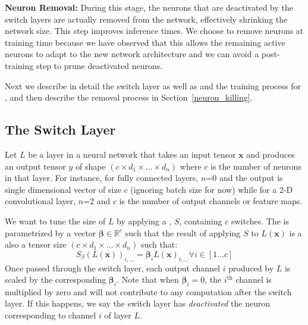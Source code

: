 \noindent\textbf{Neuron Removal: } During this stage, the neurons that are
deactivated by the switch layers are actually removed from the network,
effectively shrinking the network size. This step improves inference times.
We choose to remove neurons at training time
because we have observed that this allows the remaining active neurons to adapt
to the new network architecture and we can avoid a post-training step to prune
deactivated neurons.


Next we describe in detail the switch layer as well as and the training process
for \shrink, and then describe the removal process in
Section~\ref{neuron_killing}.

\subsection{The Switch Layer}

Let $L$ be a layer in a neural network that takes an input tensor $\bm{x}$ and
produces an output tensor $y$ of shape $\left(c \times d_1 \times \dots \times
d_n\right)$ where $c$ is the number of neurons in that layer.  For instance, for
fully connected layers, $n$=0 and the output is single dimensional vector of size $c$
(ignoring batch size for now) while for a 2-D convolutional layer, $n$=2 and $c$
is the number of output channels or feature maps.

We want to tune the size of $L$ by applying a \swl, $S$, containing $c$
switches.  The \swl is parametrized by a vector $\bm{\beta} \in \mathbb{R}^c$ such that the result
of applying $S$ to $L(\bm{x})$ is a also a tensor size $\left(c \times d_1
\times \dots \times d_n\right)$ such that: 
\begin{equation} 
S_{\beta}(L(\bm{x}))_{i,...} = \bm{\beta}_iL(\bm{x})_{i, ...} \forall i \in [1\ldots c]
\end{equation}
Once passed through the switch layer, each output channel $i$
produced by $L$ is scaled by the corresponding $\bm{\beta}_i$. Note that when
$\bm{\beta}_i = 0$, the $i^{\text{th}}$ channel is multiplied by zero and will not
contribute to any computation after the switch layer. If this happens, we say
the switch layer has {\it deactivated} the neuron corresponding to channel $i$ of layer $L$.

